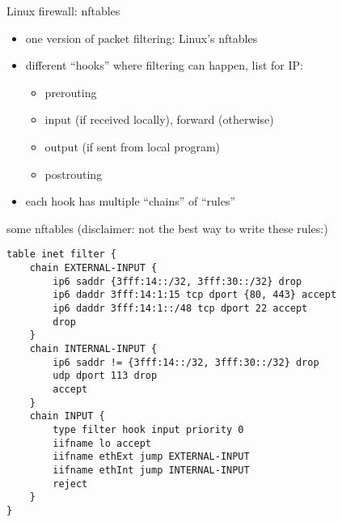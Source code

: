 \begin{frame}[fragile]{Linux firewall: nftables}
\begin{itemize}
\item one version of packet filtering: Linux's nftables
\item different ``hooks'' where filtering can happen, list for IP:
    \begin{itemize}
    \item prerouting
    \item input (if received locally), forward (otherwise)
    \item output (if sent from local program)
    \item postrouting
    \end{itemize}
\item each hook has multiple ``chains'' of ``rules''
\end{itemize}
\end{frame}

\begin{frame}[fragile]{some nftables}
(disclaimer: not the best way to write these rules:)
\begin{Verbatim}[fontsize=\fontsize{9}{10}\selectfont]
table inet filter {
    chain EXTERNAL-INPUT {
        ip6 saddr {3fff:14::/32, 3fff:30::/32} drop
        ip6 daddr 3fff:14:1:15 tcp dport {80, 443} accept
        ip6 daddr 3fff:14:1::/48 tcp dport 22 accept
        drop
    }
    chain INTERNAL-INPUT {
        ip6 saddr != {3fff:14::/32, 3fff:30::/32} drop
        udp dport 113 drop
        accept
    }
    chain INPUT {
        type filter hook input priority 0
        iifname lo accept
        iifname ethExt jump EXTERNAL-INPUT
        iifname ethInt jump INTERNAL-INPUT
        reject
    }
}
\end{Verbatim}
\end{frame}

